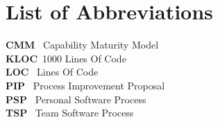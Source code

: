 
\tableofcontents

\newpage
\listoftables
\listoffigures

\newpage
\chapter*{List of Abbreviations}
{\bf CMM} \dotfill\ Capability Maturity Model\\
{\bf KLOC}\dotfill\ 1000 Lines Of Code\\
{\bf LOC} \dotfill\ Lines Of Code\\
{\bf PIP} \dotfill\ Process Improvement Proposal\\
{\bf PSP} \dotfill\ Personal Software Process\\
{\bf TSP} \dotfill\ Team Software Process\\

\newpage









